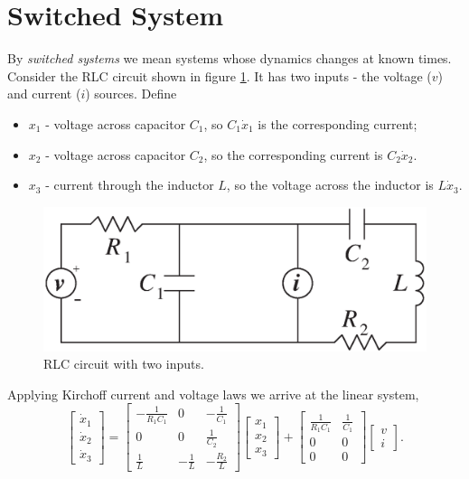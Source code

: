 \documentclass{report}
\begin{document}
\section{Switched System}
By {\it switched systems} we mean systems whose dynamics
changes at known times. Consider the RLC circuit shown in figure \ref{rlcfig}.
It has two inputs - the voltage ($v$) and current ($i$) sources.
Define
\begin{itemize}
\item $x_1$ - voltage across capacitor $C_1$, so $C_1\dot{x}_1$ is
the corresponding current;
\item $x_2$ - voltage across capacitor $C_2$, so the corresponding
current is $C_2\dot{x}_2$.
\item $x_3$ - current through the inductor $L$, so the voltage across
the inductor is $L\dot{x}_3$.
\end{itemize}
\begin{figure}[htbp]
\centerline{
\includegraphics[height=5 cm]{rlc.eps}}
\caption{RLC circuit with two inputs.}
\label{rlcfig}
\end{figure}
Applying Kirchoff current and voltage laws we arrive at the linear system,
\begin{equation}
\left[\begin{array}{c}
\dot{x}_1\\
\dot{x}_2\\
\dot{x}_3\end{array}\right] = \left[\begin{array}{ccc}
-\frac{1}{R_1C_1} & 0 & -\frac{1}{C_1}\\
0 & 0 & \frac{1}{C_2}\\
\frac{1}{L} & -\frac{1}{L} & -\frac{R_2}{L}\end{array}\right]
\left[\begin{array}{c}
x_1\\
x_2\\
x_3\end{array}\right] + \left[\begin{array}{cc}
\frac{1}{R_1C_1} & \frac{1}{C_1}\\
0 & 0\\
0 & 0\end{array}\right]\left[\begin{array}{c}
v\\
i\end{array}\right]. \label{rlceq}
\end{equation}
\end{document}
